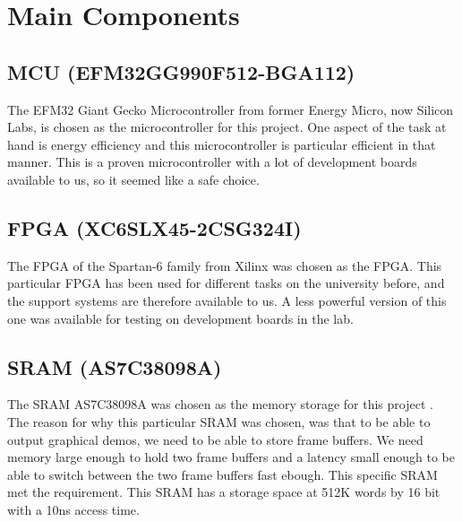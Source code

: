 \documentclass[../main/report.tex]{subfiles}
\begin{document}
\section{Main Components}

\subsection*{MCU (EFM32GG990F512-BGA112)}
The EFM32 Giant Gecko Microcontroller from former Energy Micro, now Silicon Labs, is chosen as the microcontroller for this project.
One aspect of the task at hand is energy efficiency and this microcontroller is particular efficient in that manner.
This is a proven microcontroller with a lot of development boards available to us, so it seemed like a safe choice.

\subsection*{FPGA (XC6SLX45-2CSG324I)}
The FPGA of the Spartan-6 family from Xilinx was chosen as the FPGA.
This particular FPGA has been used for different tasks on the university before, and the support systems are therefore available to us.
A less powerful version of this one was available for testing on development boards in the lab.

\subsection*{SRAM (AS7C38098A)}
The SRAM AS7C38098A was chosen as the memory storage for this project \cite{SRAM-datasheet}. 
The reason for why this particular SRAM was chosen, was that to be able to output graphical demos, we need to be able to store frame buffers.
We need  memory large enough to hold two frame buffers and a latency small enough to be able to switch between the two frame buffers fast ebough.
This specific SRAM met the requirement.
This SRAM has a storage space at 512K words by 16 bit with a 10ns access time.
\end{document}
